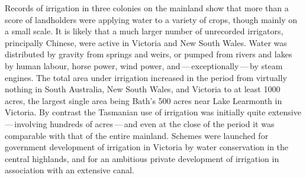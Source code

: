 \closure
Records of irrigation in three colonies on the mainland show that more
than a score of landholders were applying water to a variety of crops,
though mainly on a small scale.  It is likely that a much larger
number of unrecorded irrigators, principally Chinese, were active in
Victoria and New South Wales.  Water was distributed by gravity from
springs and weirs, or pumped from rivers and lakes by human labour,
horse power, wind power, and\,---\,exceptionally\,---\,by steam
engines.  The total area under irrigation increased in the period from
virtually nothing in South Australia, New South Wales, and Victoria to
at least 1000 acres, the largest single area being Bath's 500 acres
near Lake Learmonth in Victoria.  By contrast the Tasmanian use of
irrigation was initially quite extensive\,---\,involving hundreds of
acres\,---\,and even at the close of the period it was comparable with
that of the entire mainland. Schemes were launched for government
development of irrigation in Victoria by water conservation in the
central highlands, and for an ambitious private development of
irrigation in association with an extensive canal.

